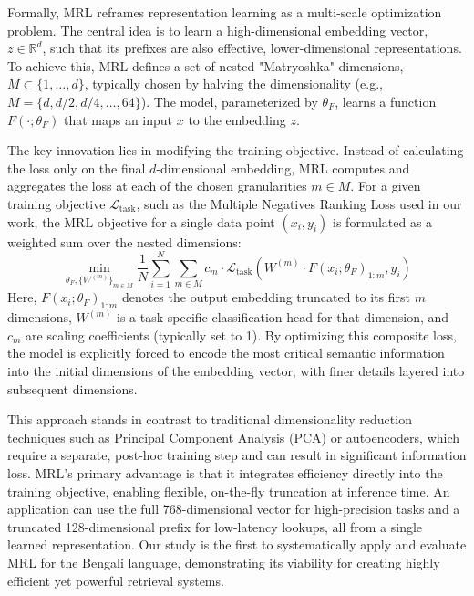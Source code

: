 \documentclass[manuscript,screen,review]{acmart}
\begin{document}
Formally, MRL reframes representation learning as a multi-scale optimization problem. The central idea is to learn a high-dimensional embedding vector, $z \in \mathbb{R}^d$, such that its prefixes are also effective, lower-dimensional representations. To achieve this, MRL defines a set of nested "Matryoshka" dimensions, $M \subset \{1, \dots, d\}$, typically chosen by halving the dimensionality (e.g., $M = \{d, d/2, d/4, \dots, 64\}$). The model, parameterized by $\theta_F$, learns a function $F(\cdot; \theta_F)$ that maps an input $x$ to the embedding $z$.

The key innovation lies in modifying the training objective. Instead of calculating the loss only on the final $d$-dimensional embedding, MRL computes and aggregates the loss at each of the chosen granularities $m \in M$. For a given training objective $\mathcal{L}_{\text{task}}$, such as the Multiple Negatives Ranking Loss used in our work, the MRL objective for a single data point $(x_i, y_i)$ is formulated as a weighted sum over the nested dimensions:
\begin{equation}
\min_{\theta_F, \{W^{(m)}\}_{m \in M}} \frac{1}{N} \sum_{i=1}^{N} \sum_{m \in M} c_m \cdot \mathcal{L}_{\text{task}}\left(W^{(m)} \cdot F(x_i; \theta_F)_{1:m}, y_i\right)
\end{equation}
Here, $F(x_i; \theta_F)_{1:m}$ denotes the output embedding truncated to its first $m$ dimensions, $W^{(m)}$ is a task-specific classification head for that dimension, and $c_m$ are scaling coefficients (typically set to 1). By optimizing this composite loss, the model is explicitly forced to encode the most critical semantic information into the initial dimensions of the embedding vector, with finer details layered into subsequent dimensions.

This approach stands in contrast to traditional dimensionality reduction techniques such as Principal Component Analysis (PCA) or autoencoders, which require a separate, post-hoc training step and can result in significant information loss. MRL's primary advantage is that it integrates efficiency directly into the training objective, enabling flexible, on-the-fly truncation at inference time. An application can use the full 768-dimensional vector for high-precision tasks and a truncated 128-dimensional prefix for low-latency lookups, all from a single learned representation. Our study is the first to systematically apply and evaluate MRL for the Bengali language, demonstrating its viability for creating highly efficient yet powerful retrieval systems.
\end{document}
